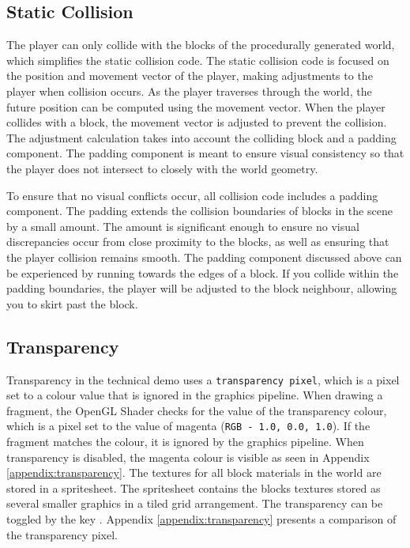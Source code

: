 \documentclass[a4paper,11pt,titlepage]{scrartcl}
\begin{document}
\subsection{Static Collision}
\label{section:collision}
The player can only collide with the blocks of the procedurally generated world, which simplifies the static collision code. The static collision code is focused on the position and movement vector of the player, making adjustments to the player when collision occurs. As the player traverses through the world, the future position can be computed using the movement vector. When the player collides with a block, the movement vector is adjusted to prevent the collision. The adjustment calculation takes into account the colliding block and a padding component. The padding component is meant to ensure visual consistency so that the player does not intersect to closely with the world geometry.

To ensure that no visual conflicts occur, all collision code includes a padding component. The padding extends the collision boundaries of blocks in the scene by a small amount. The amount is significant enough to ensure no visual discrepancies occur from close proximity to the blocks, as well as ensuring that the player collision remains smooth. The padding component discussed above can be experienced by running towards the edges of a block. If you collide within the padding boundaries, the player will be adjusted to the block neighbour, allowing you to skirt past the block.
   
\subsection{Transparency}
\label{section:transparency}
Transparency in the technical demo uses a \texttt{transparency pixel}, which is a pixel set to a colour value that is ignored in the graphics pipeline.  When drawing a fragment, the OpenGL Shader checks for the value of the transparency colour, which is a pixel set to the value of magenta (\texttt{RGB - 1.0, 0.0, 1.0}).  If the fragment matches the colour, it is ignored by the graphics pipeline.  When transparency is disabled, the magenta colour is visible as seen in Appendix \ref{appendix:transparency}.  The textures for all block materials in the world are stored in a spritesheet.  The spritesheet contains the blocks textures stored as several smaller graphics in a tiled grid arrangement.
\vskip 2.5mm\noindent
The transparency can be toggled by the key .  Appendix \ref{appendix:transparency} presents a comparison of the transparency pixel.
    
\end{document}
